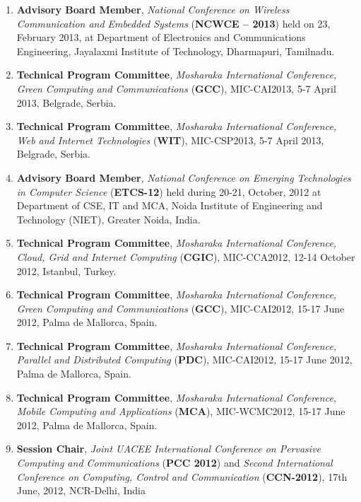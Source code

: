 \begin{enumerate}
\item
\textbf{Advisory Board Member}, \textit{National Conference on Wireless Communication and Embedded Systems} (\textbf{NCWCE – 2013}) held on 23, February 2013, at Department of Electronics and Communications Engineering, Jayalaxmi Institute of Technology, Dharmapuri, Tamilnadu. 

\item
\textbf{Technical Program Committee}, \textit{Mosharaka International Conference, Green Computing and Communications} (\textbf{GCC}), MIC-CAI2013, 5-7 April 2013, Belgrade, Serbia.

\item
\textbf{Technical Program Committee}, \textit{Mosharaka International Conference, Web and Internet Technologies} (\textbf{WIT}), MIC-CSP2013, 5-7 April 2013, Belgrade, Serbia.

\item
\textbf{Advisory Board Member}, \textit{National Conference on Emerging Technologies in Computer Science}  (\textbf{ETCS-12})  held during 20-21, October, 2012 at Department of CSE, IT and MCA, Noida Institute of Engineering and Technology (NIET), Greater Noida, India.

\item
\textbf{Technical Program Committee}, \textit{Mosharaka International Conference, Cloud, Grid and Internet Computing} (\textbf{CGIC}), MIC-CCA2012, 12-14 October 2012, Istanbul, Turkey.

\item
\textbf{Technical Program Committee}, \textit{Mosharaka International Conference, Green Computing and Communications} (\textbf{GCC}), MIC-CAI2012, 15-17 June 2012, Palma de Mallorca, Spain.

\item
\textbf{Technical Program Committee},\textit{ Mosharaka International Conference, Parallel and Distributed Computing} (\textbf{PDC}), MIC-CAI2012, 15-17 June 2012, Palma de Mallorca, Spain.

\item
\textbf{Technical Program Committee},\textit{ Mosharaka International Conference, Mobile Computing and Applications} (\textbf{MCA}), MIC-WCMC2012, 15-17 June 2012,  Palma de Mallorca, Spain.

\item
\textbf{Session Chair},\textit{ Joint UACEE International Conference on Pervasive Computing and Communications} (\textbf{PCC 2012}) and \textit{Second International Conference on Computing, Control and Communication }(\textbf{CCN-2012}), 17th June, 2012, NCR-Delhi, India


\end{enumerate}
